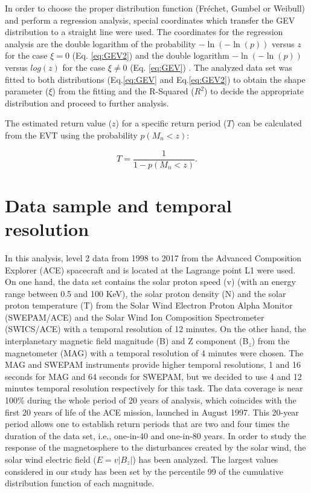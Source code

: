 \documentclass{article}
\begin{document}
In order to choose the proper distribution function (Fréchet, Gumbel or Weibull) and perform a regression analysis, special coordinates which transfer the GEV distribution to a straight line were used.
The coordinates for the regression analysis are the double logarithm of the probability $-\ln\left(-\ln(p)\right)$ versus $z$ for the case $\xi = 0$ (Eq. \ref{eq:GEV2}) and the double logarithm $-\ln\left(-\ln(p)\right)$ versus $log(z)$ for the case $\xi \neq 0$ (Eq. \ref{eq:GEV}) \cite{Coles_2001_Extreme_Book}. The analyzed data set was fitted to both distributions (Eq.\ref{eq:GEV} and Eq.\ref{eq:GEV2}) to obtain the shape parameter ($\xi$) from the fitting and the R-Squared ($R^{2}$) to decide the appropriate distribution and proceed to further analysis.

The estimated return value ($z$) for a specific return period ($T$) can be calculated from the EVT using the probability $p(M_n<z)$:

\begin{equation}
    T=\frac{1}{1-p\left(M_n<z\right)}.
    \label{eq:return_period}
\end{equation}

\section{Data sample and temporal resolution} \label{sec:data}

In this analysis, level 2 data from 1998 to 2017 from the Advanced Composition Explorer (ACE) spacecraft and is located at the Lagrange point L1 were used. On one hand, the data set contains the solar proton speed (v) (with an energy range between 0.5 and 100 KeV), the solar proton density (N) and the solar proton temperature (T) from the Solar Wind Electron Proton Alpha Monitor 
(SWEPAM/ACE) \cite{McComas_1998_ACE_SWEPAM} and the Solar Wind Ion Composition Spectrometer (SWICS/ACE) \cite{Gloeckler_1998_SWICS} with a temporal resolution of 12 minutes. On the other hand, the interplanetary magnetic field magnitude (B) and Z component (B$_{z}$) from the magnetometer (MAG) \cite{Smith_1998_ACE} with a temporal resolution of 4 minutes were chosen.
The MAG and SWEPAM instruments provide higher temporal resolutions, 1 and 16 seconds for MAG and 64 seconds for SWEPAM, but we decided to use 4 and 12 minutes temporal resolution respectively for this task.
The data coverage is near 100\% during the whole period of 20 years of analysis, which coincides with the first 20 years of life of the ACE mission, launched in August 1997. This 20-year period allows one to establish return periods that are two and four times the duration of the data set, i.e., one-in-40 and one-in-80 years.
In order to study the response of the magnetosphere to the disturbances created by the solar wind, the solar wind electric field ($E=v|B_{z}|$) has been analyzed. 
The largest values considered in our study has been set by the percentile 99 of the cumulative distribution function of each magnitude.
\end{document}
